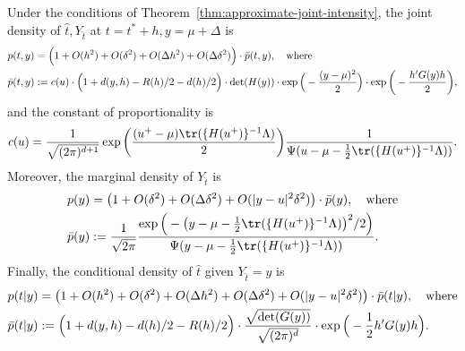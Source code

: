 \documentclass{article}
\begin{document}
	\begin{theorem}
		\label{thm:approximate-joint-distribution}
		Under the conditions of Theorem~\ref{thm:approximate-joint-intensity}, the joint density of $\hat{t},Y_{\hat{t}}$ at $t = t^* + h,y = \mu + \Delta$ is
		\begin{equation}
			\label{eqn:approximate-joint-density}
			\begin{aligned}
				p(t,y) & = \Big(1 + O(h^2) + O(\delta^2) + O(\Delta h^2) + O(\Delta\delta^2)\Big) \cdot \bar{p}(t,y), \quad {\rm where} \\
				\bar{p}(t,y) & := c(u) \cdot\Big(1 + d(y,h) - R(h)/2 - d(h)/2\Big) \cdot \det(H(y)) \cdot \exp\Big(-\frac{(y - \mu)^2}{2}\Big) \cdot \exp\bigg(-\frac{h' G(y)h}{2}\bigg),
			\end{aligned}
		\end{equation}
		and the constant of proportionality is
		\begin{equation}
			\label{eqn:approximate-joint-density-constant-of-proportionality}
			c(u) = \frac{1}{\sqrt{(2\pi)^{d + 1}}} \exp\bigg(\frac{(u^+ - \mu)\tr(\{H(u^{+})\}^{-1}\Lambda)}{2}\bigg)
			\frac{1}{\Psi(u - \mu - \frac{1}{2}\tr(\{H(u^{+})\}^{-1}\Lambda))}.
		\end{equation}
		Moreover, the marginal density of $Y_{\hat{t}}$ is 
		\begin{equation}
			\label{eqn:approximate-marginal-density-height}
			\begin{aligned}
				p(y) & = \big(1 + O(\delta^2) + O(\Delta \delta^2) + O(|y - u|^2 \delta^2)\big) \cdot \bar{p}(y), \quad {\rm where} \\ 
				\bar{p}(y) & := \frac{1}{\sqrt{2\pi}}\frac{\exp\Big(-\big(y - \mu - \frac{1}{2}\tr(\{H(u^+)\}^{-1}\Lambda)\big)^2/2\Big) }{\Psi(y - \mu - \frac{1}{2}\tr(\{H(u^+)\}^{-1}\Lambda))}.
			\end{aligned}
		\end{equation}
		Finally, the conditional density of $\hat{t}$ given $Y_{\hat{t}} = y$ is 
		\begin{equation}
			\label{eqn:approximate-conditional-density-location}
			\begin{aligned}
				p(t|y) & = \big(1 + O(h^2) + O(\delta^2) + O(\Delta h^2) + O(\Delta\delta^2) + O(|y - u|^2 \delta^2)\big) \cdot \bar{p}(t|y), \quad {\rm where} \\
				\bar{p}(t|y) & := \Big(1 + d(y,h) - d(h)/2 - R(h)/2\Big) \cdot \frac{\sqrt{\det(G(y))}}{\sqrt{(2\pi)^d}} \cdot \exp\Big(-\frac{1}{2}h'G(y) h\Big).
			\end{aligned}
		\end{equation}
	\end{theorem}
\end{document}
